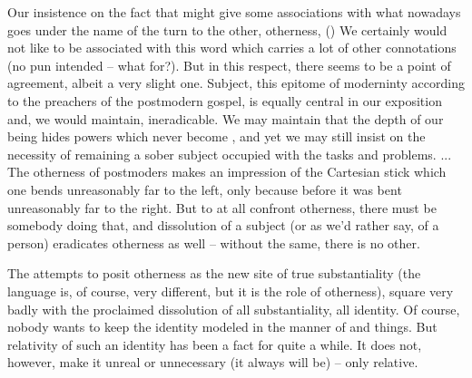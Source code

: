 \pa
Our insistence on the fact that  might give some
associations with 
what nowadays goes under the name of the  turn to the other,
otherness, () We certainly would not like to be
associated with this word which carries a lot of other connotations (no pun
intended -- what for?). But in this respect, there seems to be a point of
agreement, albeit a very slight one. Subject, this epitome of moderninty
according to the preachers of the postmodern gospel, is equally central in our
exposition and, we would maintain, ineradicable.  We may maintain that
the depth of our being hides  powers which never become
, and yet we may still insist on the necessity of remaining a sober
subject occupied with the  tasks and problems.
...
The otherness of postmoders makes an impression of the Cartesian stick which one
bends unreasonably far to the left, only because before it was bent unreasonably
far to the right. But to at all confront otherness, there must be somebody doing
that, and dissolution of a subject (or as we'd rather say, of a person)
eradicates otherness as well -- without the same, there is no other. 

The attempts to posit otherness as the new site of true substantiality (the
language is, of course, very different, but it is the role of otherness),
square very badly with the proclaimed dissolution of all substantiality, all
identity. Of course, nobody wants to keep the identity modeled in the
 manner of  and things. But relativity of such
an identity has been a fact for quite a while. It does not, however, make it
unreal or unnecessary (it always will be) -- only relative. 



